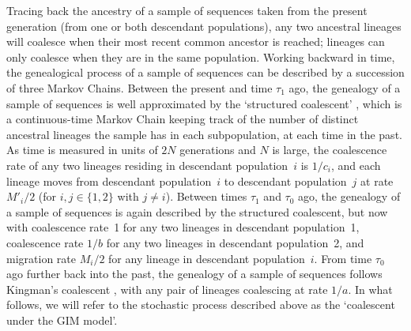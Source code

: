 \documentclass[11pt]{article}
\begin{document}
Tracing back the ancestry of a sample of sequences taken from the present generation (from one or both descendant populations), any two ancestral lineages will coalesce when their most recent common ancestor is reached; lineages can only coalesce when they are in the same population. Working backward in time, the genealogical process of a sample of sequences can be described by a succession of three Markov Chains. Between the present and time $\tau_1$ ago, the genealogy of a sample of sequences is
well approximated by the `structured coalescent' \citep{Takahata1988,Notohara1990,Herbots1997,Kozakai2016}, which is a continuous-time Markov Chain keeping track of 
the number of distinct ancestral lineages the sample has in each subpopulation, at each time in the past.
As time is measured in units of $2N$ generations and $N$ is large, the coalescence rate of any two lineages residing in descendant population~$i$ is $1/c_i$, and each lineage moves from descendant population~$i$ to descendant population~$j$ at
rate $M'_i/2$ (for $i,j \in \{1,2\}$ with $j \neq i$). Between times $\tau_1$ and $\tau_0$ ago, the genealogy of a sample of sequences
is again described by the structured coalescent, but now with coalescence rate~1 for any two lineages in descendant population~1, coalescence rate $1/b$ for any two lineages in descendant population~2, and migration rate $M_i/2$ for any lineage in descendant population~$i$. From time $\tau_0$ ago
further back into the past, the genealogy of a sample of sequences follows Kingman's coalescent \citep{Kingman1982c, Kingman1982a, Kingman1982b}, with any pair of lineages coalescing at rate $1/a$. In what follows, we will refer to the stochastic process described above as the `coalescent under the GIM model'.
\end{document}
